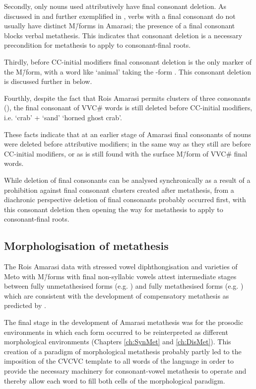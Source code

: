 Secondly, only nouns used attributively have final
consonant deletion. As discussed in
 and further exemplified in ,
verbs with a final consonant do not usually have distinct
M\=/forms in Amarasi; the presence of a final consonant blocks verbal metathesis.
This indicates that consonant deletion
is a necessary precondition for metathesis
to apply to consonant-final roots.

Thirdly, before CC-initial modifiers final consonant
deletion is the only marker of the M\=/form,
with a word like  `animal' taking
the {\MC}-form . This consonant deletion is
discussed further in  below.

Fourthly, despite the fact that Ro{\Q}is Amarasi
permits clusters of three consonants (),
the final consonant of VVC{\#} words is still deleted
before CC-initial modifiers, i.e.  `crab' +  `sand'
{\ra}  `horned ghost crab'.

These facts indicate that at an earlier
stage of Amarasi final consonants of nouns were
deleted before attributive modifiers;
in the same way as they still are before CC-initial modifiers,
or as is still found with the surface M\=/form of VVC{\#} final words.

While deletion of final consonants
can be analysed synchronically as a result of a prohibition against
final consonant clusters created after metathesis,
from a diachronic perspective deletion
of final consonants probably occurred first, with
this consonant deletion then opening the way for
metathesis to apply to consonant-final roots.

\subsection{Morphologisation of metathesis}
The Ro{\Q}is Amarasi data with stressed vowel diphthongisation
and varieties of Meto with M\=/forms with final non-syllabic vowels
attest intermediate stages between fully unmetathesised
forms (e.g. ) and fully metathesised forms
(e.g. ) which are consistent
with the development of compensatory metathesis
as predicted by \citet{blga98}.

The final stage in the development of Amarasi metathesis was
for the prosodic environments in which each form occurred
to be reinterpreted as different morphological environments
(Chapters \ref{ch:SynMet} and \ref{ch:DisMet}).
This creation of a paradigm of morphological metathesis
probably partly led to the imposition of the CVCVC template to all words of the language
in order to provide the necessary machinery for consonant-vowel metathesis to operate
and thereby allow each word to fill both cells of the morphological paradigm.

